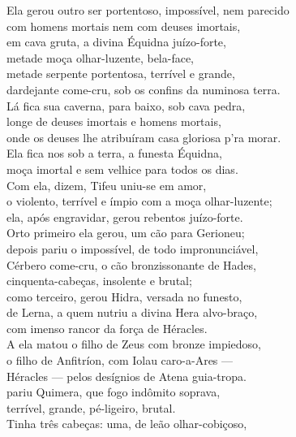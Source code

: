 \begin{pages}
\begin{Rightside}
\quad{}Ela gerou outro ser portentoso, impossível, nem parecido \\
com homens mortais nem com deuses imortais,\\
em cava gruta, a divina Équidna juízo-forte,\\
metade moça olhar-luzente, bela-face,\\
metade serpente portentosa, terrível e grande,\\
dardejante come-cru, sob os confins da numinosa terra. \\
Lá fica sua caverna, para baixo, sob cava pedra,\\
longe de deuses imortais e homens mortais,\\
onde os deuses lhe atribuíram casa gloriosa p'ra morar.\\

\quad{}Ela fica nos  sob a terra, a funesta Équidna,\\
moça imortal e sem velhice para todos os dias. \\
Com ela, dizem, Tifeu uniu-se em amor,\\
o violento, terrível e ímpio com a moça olhar-luzente;\\
ela, após engravidar, gerou rebentos juízo-forte.\\
Orto primeiro ela gerou, um cão para Gerioneu;\\
depois pariu o impossível, de todo impronunciável, \\
Cérbero come-cru, o cão bronzissonante de Hades,\\
cinquenta-cabeças, insolente e brutal;\\
como terceiro, gerou Hidra, versada no funesto,\\
de Lerna, a quem nutriu a divina Hera alvo-braço,\\
com imenso rancor da força de Héracles. \\
A ela matou o filho de Zeus com bronze impiedoso,\\
o filho de Anfitríon, com Iolau caro-a-Ares ---\\
Héracles --- pelos desígnios de Atena guia-tropa.\\
 pariu Quimera, que fogo indômito soprava,\\
terrível, grande, pé-ligeiro, brutal.\\ 
Tinha três cabeças: uma, de leão olhar-cobiçoso,\\

\end{Rightside}
\end{pages}
